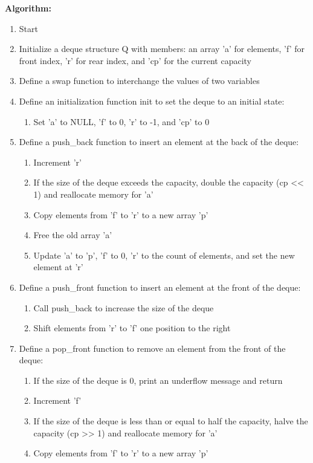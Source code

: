 \documentclass{article}
\begin{document}
\textbf{Algorithm:}
\begin{enumerate}
  \item Start
  \item Initialize a deque structure Q with members: an array 'a' for elements, 'f' for front index, 'r' for rear index, and 'cp' for the current capacity
  \item Define a swap function to interchange the values of two variables
  \item Define an initialization function init to set the deque to an initial state:
    \begin{enumerate}
      \item Set 'a' to NULL, 'f' to 0, 'r' to -1, and 'cp' to 0
    \end{enumerate}
  \item Define a push\_back function to insert an element at the back of the deque:
    \begin{enumerate}
      \item Increment 'r'
      \item If the size of the deque exceeds the capacity, double the capacity (cp << 1) and reallocate memory for 'a'
      \item Copy elements from 'f' to 'r' to a new array 'p'
      \item Free the old array 'a'
      \item Update 'a' to 'p', 'f' to 0, 'r' to the count of elements, and set the new element at 'r'
    \end{enumerate}
  \item Define a push\_front function to insert an element at the front of the deque:
    \begin{enumerate}
      \item Call push\_back to increase the size of the deque
      \item Shift elements from 'r' to 'f' one position to the right
    \end{enumerate}
  \item Define a pop\_front function to remove an element from the front of the deque:
    \begin{enumerate}
      \item If the size of the deque is 0, print an underflow message and return
      \item Increment 'f'
      \item If the size of the deque is less than or equal to half the capacity, halve the capacity (cp >> 1) and reallocate memory for 'a'
      \item Copy elements from 'f' to 'r' to a new array 'p'

\end{enumerate}
\end{enumerate}
\end{document}
